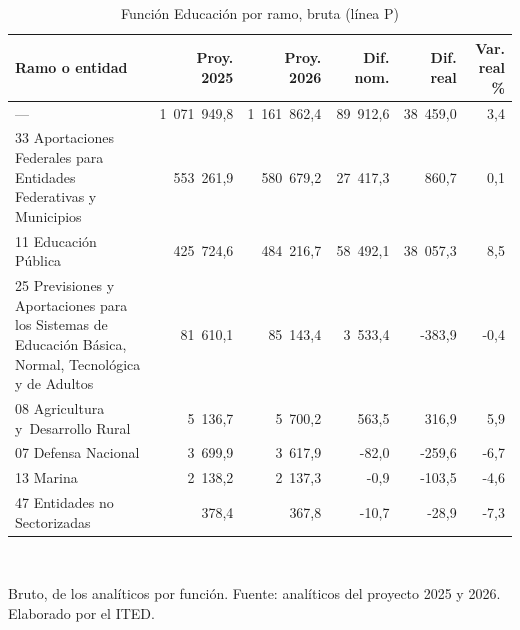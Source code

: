 \begin{table}[htbp]
\centering
\scriptsize
\caption{Función Educación por ramo, bruta (línea P)}
\label{cua:C6_1}
\begin{tabular}{p{6.2cm}rrrrr}
\toprule
\textbf{Ramo o entidad} & \textbf{Proy. 2025} & \textbf{Proy. 2026} & \textbf{Dif. nom.} & \textbf{Dif. real} & \textbf{Var. real \%} \\
\midrule
--- & 1 071 949,8 & 1 161 862,4 & 89 912,6 & 38 459,0 & 3,4 \\
33 Aportaciones Federales para Entidades Federativas y Municipios & 553 261,9 & 580 679,2 & 27 417,3 & 860,7 & 0,1 \\
11 Educación Pública & 425 724,6 & 484 216,7 & 58 492,1 & 38 057,3 & 8,5 \\
25 Previsiones y Aportaciones para los Sistemas de Educación Básica, Normal, Tecnológica y de Adultos & 81 610,1 & 85 143,4 & 3 533,4 & -383,9 & -0,4 \\
08 Agricultura y Desarrollo Rural & 5 136,7 & 5 700,2 & 563,5 & 316,9 & 5,9 \\
07 Defensa Nacional & 3 699,9 & 3 617,9 & -82,0 & -259,6 & -6,7 \\
13 Marina & 2 138,2 & 2 137,3 & -0,9 & -103,5 & -4,6 \\
47 Entidades no Sectorizadas & 378,4 & 367,8 & -10,7 & -28,9 & -7,3 \\
\bottomrule
\end{tabular}
\\[2pt]\begin{minipage}{0.92\textwidth}\scriptsize Bruto, de los analíticos por función. Fuente: analíticos del proyecto 2025 y 2026. Elaborado por el ITED.\end{minipage}
\end{table}
